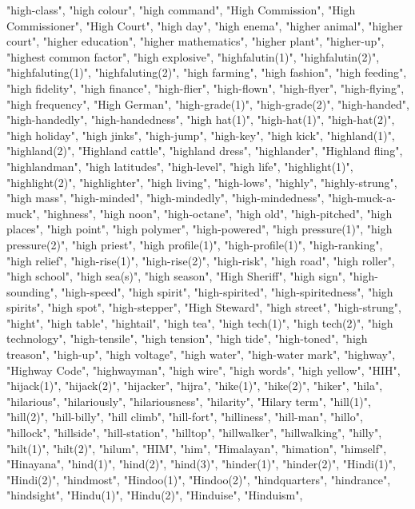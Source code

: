 "high-class",
"high colour",
"high command",
"High Commission",
"High Commissioner",
"High Court",
"high day",
"high enema",
"higher animal",
"higher court",
"higher education",
"higher mathematics",
"higher plant",
"higher-up",
"highest common factor",
"high explosive",
"highfalutin(1)",
"highfalutin(2)",
"highfaluting(1)",
"highfaluting(2)",
"high farming",
"high fashion",
"high feeding",
"high fidelity",
"high finance",
"high-flier",
"high-flown",
"high-flyer",
"high-flying",
"high frequency",
"High German",
"high-grade(1)",
"high-grade(2)",
"high-handed",
"high-handedly",
"high-handedness",
"high hat(1)",
"high-hat(1)",
"high-hat(2)",
"high holiday",
"high jinks",
"high-jump",
"high-key",
"high kick",
"highland(1)",
"highland(2)",
"Highland cattle",
"highland dress",
"highlander",
"Highland fling",
"highlandman",
"high latitudes",
"high-level",
"high life",
"highlight(1)",
"highlight(2)",
"highlighter",
"high living",
"high-lows",
"highly",
"highly-strung",
"high mass",
"high-minded",
"high-mindedly",
"high-mindedness",
"high-muck-a-muck",
"highness",
"high noon",
"high-octane",
"high old",
"high-pitched",
"high places",
"high point",
"high polymer",
"high-powered",
"high pressure(1)",
"high pressure(2)",
"high priest",
"high profile(1)",
"high-profile(1)",
"high-ranking",
"high relief",
"high-rise(1)",
"high-rise(2)",
"high-risk",
"high road",
"high roller",
"high school",
"high sea(s)",
"high season",
"High Sheriff",
"high sign",
"high-sounding",
"high-speed",
"high spirit",
"high-spirited",
"high-spiritedness",
"high spirits",
"high spot",
"high-stepper",
"High Steward",
"high street",
"high-strung",
"hight",
"high table",
"hightail",
"high tea",
"high tech(1)",
"high tech(2)",
"high technology",
"high-tensile",
"high tension",
"high tide",
"high-toned",
"high treason",
"high-up",
"high voltage",
"high water",
"high-water mark",
"highway",
"Highway Code",
"highwayman",
"high wire",
"high words",
"high yellow",
"HIH",
"hijack(1)",
"hijack(2)",
"hijacker",
"hijra",
"hike(1)",
"hike(2)",
"hiker",
"hila",
"hilarious",
"hilariously",
"hilariousness",
"hilarity",
"Hilary term",
"hill(1)",
"hill(2)",
"hill-billy",
"hill climb",
"hill-fort",
"hilliness",
"hill-man",
"hillo",
"hillock",
"hillside",
"hill-station",
"hilltop",
"hillwalker",
"hillwalking",
"hilly",
"hilt(1)",
"hilt(2)",
"hilum",
"HIM",
"him",
"Himalayan",
"himation",
"himself",
"Hinayana",
"hind(1)",
"hind(2)",
"hind(3)",
"hinder(1)",
"hinder(2)",
"Hindi(1)",
"Hindi(2)",
"hindmost",
"Hindoo(1)",
"Hindoo(2)",
"hindquarters",
"hindrance",
"hindsight",
"Hindu(1)",
"Hindu(2)",
"Hinduise",
"Hinduism",
